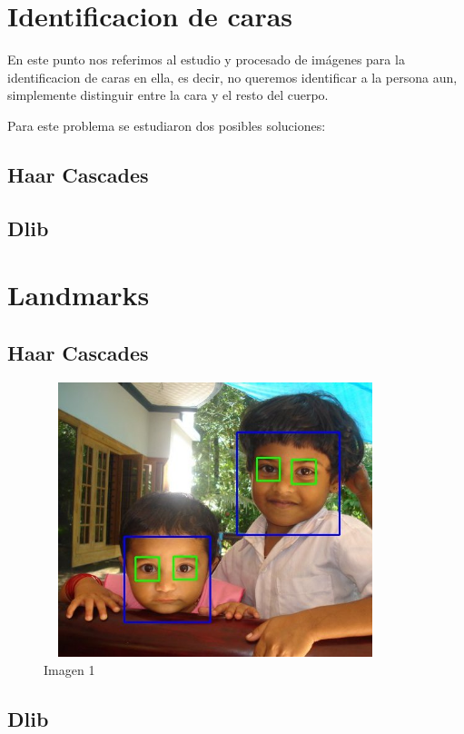 \documentclass{article}
\begin{document}
\section{Identificacion de caras}
En este punto nos referimos al estudio y procesado de imágenes para la identificacion de caras en ella, es decir, no queremos identificar a la persona aun, simplemente distinguir entre la cara y el resto del cuerpo.

Para este problema se estudiaron dos posibles soluciones:

\subsection{Haar Cascades}

\subsection{Dlib}


\section{Landmarks}

\subsection{Haar Cascades}


\begin{figure}[H]
  \centering
  \includegraphics[width=100mm, height=80mm]{images/face_detection_haar_cascades.jpg}
  \caption{Imagen 1}
\end{figure}

\subsection{Dlib}
\end{document}
